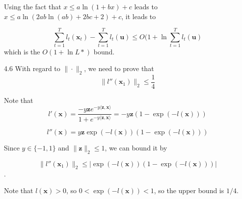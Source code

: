 \documentclass{article}
\begin{document}
Using the fact that $x\leq a\ln (1+bx) +c$ leads to $x\leq a\ln (2ab\ln (ab) + 2bc + 2) + c$, it leads to 


$$\sum_{t=1}^T l_t(\mathbf{x}_t) - \sum_{t=1}^T l_t(\mathbf{u})  \leq O(1+\ln \sum_{t=1}^T l_t(\mathbf{u})$$
which is the $O(1+\ln L*)$ bound.

4.6 With regard to $\|\cdot\|_2$, we need to prove that
$$\| l''(\mathbf{x}_1) \|_2 \leq \frac{1}{4}$$

Note that $$ l'(\mathbf{x}) = \frac{-y\mathbf{z} e^{-y\langle \mathbf{z},\mathbf{x} \rangle}}{1 + e^{-y\langle \mathbf{z}, \mathbf{x} \rangle}} = -y\mathbf{z} (1-\exp(-l(\mathbf{x})))$$

$$ l''(\mathbf{x}) = y\mathbf{z} \exp(-l(\mathbf{x})) (1-\exp(-l(\mathbf{x})))$$

	Since $y\in\{-1, 1\}$ and $\|\mathbf{z}\|_2 \leq 1$, we can bound it by
	
	$$\| l''(\mathbf{x}_1) \|_2 \leq \left|\exp(-l(\mathbf{x})) (1-\exp(-l(\mathbf{x})))\right|$$.
	
Note that $l(\mathbf{x})>0$, so $0<\exp(-l(\mathbf{x}))<1$, so the upper bound is $1/4$.
\end{document}
